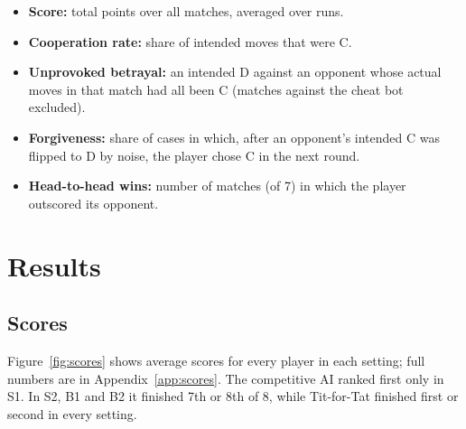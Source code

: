 \documentclass[11pt,a4paper]{article}
\begin{document}
\begin{itemize}
  \item \textbf{Score:} total points over all matches, averaged over runs.
  \item \textbf{Cooperation rate:} share of intended moves that were C.
  \item \textbf{Unprovoked betrayal:} an intended D against an opponent whose actual moves in that match had all been C (matches against the cheat bot excluded).
  \item \textbf{Forgiveness:} share of cases in which, after an opponent's intended C was flipped to D by noise, the player chose C in the next round.
  \item \textbf{Head-to-head wins:} number of matches (of 7) in which the player outscored its opponent.
\end{itemize}

\section{Results}

\subsection{Scores}

Figure~\ref{fig:scores} shows average scores for every player in each setting; full numbers are in Appendix~\ref{app:scores}. The competitive AI ranked first only in S1. In S2, B1 and B2 it finished 7th or 8th of 8, while Tit-for-Tat finished first or second in every setting.
\end{document}
